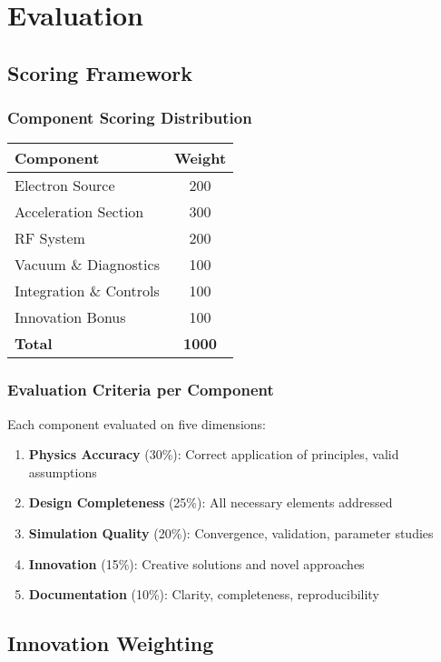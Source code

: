 
\renewcommand{\thesection}{E}
\section{Evaluation}

\subsection{Scoring Framework}

\subsubsection{Component Scoring Distribution}
\begin{tabular}{lc}
\toprule
Component & Weight \\
\midrule
Electron Source & 200 \\
Acceleration Section & 300 \\
RF System & 200 \\
Vacuum \& Diagnostics & 100 \\
Integration \& Controls & 100 \\
Innovation Bonus & 100 \\
\midrule
\textbf{Total} & \textbf{1000} \\
\bottomrule
\end{tabular}

\subsubsection{Evaluation Criteria per Component}
Each component evaluated on five dimensions:
\begin{enumerate}[noitemsep]
    \item \textbf{Physics Accuracy} (30\%): Correct application of principles, valid assumptions
    \item \textbf{Design Completeness} (25\%): All necessary elements addressed
    \item \textbf{Simulation Quality} (20\%): Convergence, validation, parameter studies
    \item \textbf{Innovation} (15\%): Creative solutions and novel approaches
    \item \textbf{Documentation} (10\%): Clarity, completeness, reproducibility
\end{enumerate}

\subsection{Innovation Weighting}

